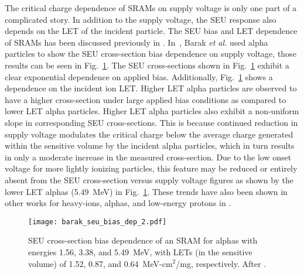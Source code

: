 The critical charge dependence of SRAMs on supply voltage is only one part of a complicated story.
In addition to the supply voltage, the SEU response also depends on the LET of the incident particle.
The SEU bias and LET dependence of SRAMs has been discussed previously in \cite{buehler1990alpha,barak1999scaling,barak2004use}.
In~\cite{barak2004use}, Barak \emph{et al.} used alpha particles to show the SEU cross-section bias dependence on supply voltage, those results can be seen in Fig.~\ref{fig:seu_vdd_dep}.
The SEU cross-sections shown in Fig.~\ref{fig:seu_vdd_dep} exhibit a clear exponential dependence on applied bias.
Additionally, Fig.~\ref{fig:seu_vdd_dep} shows a dependence on the incident ion LET.
Higher LET alpha particles are observed to have a higher cross-section under large applied bias conditions as compared to lower LET alpha particles.
Higher LET alpha particles also exhibit a non-uniform slope in corresponding SEU cross-sections.
This is because continued reduction in supply voltage modulates the critical charge below the average charge generated within the sensitive volume by the incident alpha particles, which in turn results in only a moderate increase in the measured cross-section.
Due to the low onset voltage for more lightly ionizing particles, this feature may be reduced or entirely absent from the SEU cross-section versus supply voltage figures as shown by the lower LET alphas (5.49~MeV) in Fig.~\ref{fig:seu_vdd_dep}.
These trends have also been shown in other works for heavy-ions, alphas, and low-energy protons in \cite{buehler1990alpha,barak1999scaling,barak2004use,Rodbell:2007vl,Heidel:2008vf}.
\begin{figure}[tb]
    \begin{center}
        \texttt{[image: barak\_seu\_bias\_dep\_2.pdf]}
    \end{center}
    \caption[SEU cross-section bias dependence of an SRAM for alphas with energies 1.56, 3.38, and 5.49~MeV, with LETs (in the sensitive volume) of 1.52, 0.87, and 0.64~MeV-cm$^2$/mg, respectively.]
    {SEU cross-section bias dependence of an SRAM for alphas with energies 1.56, 3.38, and 5.49~MeV, with LETs (in the sensitive volume) of 1.52, 0.87, and 0.64~MeV-cm$^2$/mg, respectively. After \cite{barak2004use}.}
    \label{fig:seu_vdd_dep}
\end{figure}

